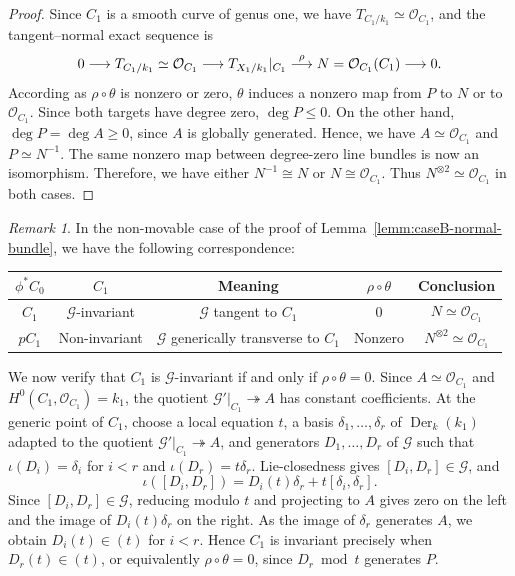 \documentclass[10pt,abstract=true]{scrartcl}
\numberwithin{equation}{section}
\theoremstyle{definition}
\theoremstyle{remark}
\newtheorem{remark}[theorem]{Remark}
\begin{document}
\begin{proof}
  Since $C_1$ is a smooth curve of  genus one, we have $T_{C_1/k_1}\simeq\mathcal O_{C_1}$, and the tangent--normal exact sequence is
  \[
    0\longrightarrow T_{C_1/k_1}\simeq\mathcal O_{C_1}
    \longrightarrow T_{X_1/k_1}|_{C_1}
    \buildrel\rho\over\longrightarrow N = \mathcal O_{C_1}(C_1)
    \longrightarrow0.
  \]
  According as $\rho\circ\theta$ is nonzero or zero, $\theta$ induces a nonzero map from $P$ to $N$ or to $\mathcal O_{C_1}$.
  Since both targets have degree zero, $\deg P\leq0$.
  On the other hand, $\deg P=\deg A\geq0$, since $A$ is globally generated.
  Hence, we have $A\simeq\mathcal O_{C_1}$ and $P\simeq N^{-1}$.
  The same nonzero map between degree-zero line bundles is now an isomorphism. Therefore, we have either $N^{-1}\cong N$ or $N\cong\mathcal O_{C_1}$.
  Thus $N^{\otimes2}\simeq\mathcal O_{C_1}$ in both cases.
\end{proof}

\begin{remark}\label{rem:caseB-invariant-curve}
  In the non-movable case of the proof of Lemma~\ref{lemm:caseB-normal-bundle}, we have the following correspondence:
  \begin{center}
    \begin{tabular}{ccccc}
      \hline
      $\phi^*C_0$ & $C_1$ & Meaning & $\rho\circ\theta$ & Conclusion \\
      \hline
      $C_1$ & $\mathscr G$-invariant & $\mathscr G$ tangent to $C_1$ & $0$ & $N\simeq\mathcal O_{C_1}$ \\
      $pC_1$ & Non-invariant & $\mathscr G$ generically transverse to $C_1$ & Nonzero & $N^{\otimes2}\simeq\mathcal O_{C_1}$ \\
      \hline
    \end{tabular}
  \end{center}
  We now verify that $C_1$ is $\mathscr G$-invariant if and only if $\rho\circ\theta=0$.
  Since $A\simeq\mathcal O_{C_1}$ and $H^0(C_1,\mathcal O_{C_1})=k_1$, the quotient $\mathscr G'|_{C_1}\twoheadrightarrow A$ has constant coefficients.
  At the generic point of $C_1$, choose a local equation $t$, a basis $\delta_1,\ldots,\delta_r$ of $\operatorname{Der}_k(k_1)$ adapted to the quotient $\mathscr G'|_{C_1}\twoheadrightarrow A$, and generators $D_1,\ldots,D_r$ of $\mathscr G$ such that $\iota(D_i)=\delta_i$ for $i<r$ and $\iota(D_r)=t\delta_r$.
  Lie-closedness gives $[D_i,D_r]\in\mathscr G$, and
  \[
    \iota([D_i,D_r])=D_i(t)\delta_r+t[\delta_i,\delta_r].
  \]
  Since $[D_i,D_r]\in\mathscr G$, reducing modulo $t$ and projecting to $A$ gives zero on the left and the image of $D_i(t)\delta_r$ on the right.
  As the image of $\delta_r$ generates $A$, we obtain $D_i(t)\in(t)$ for $i<r$.
  Hence $C_1$ is invariant precisely when $D_r(t)\in(t)$, or equivalently $\rho\circ\theta=0$, since $D_r\bmod t$ generates $P$.
\end{remark}
\end{document}
